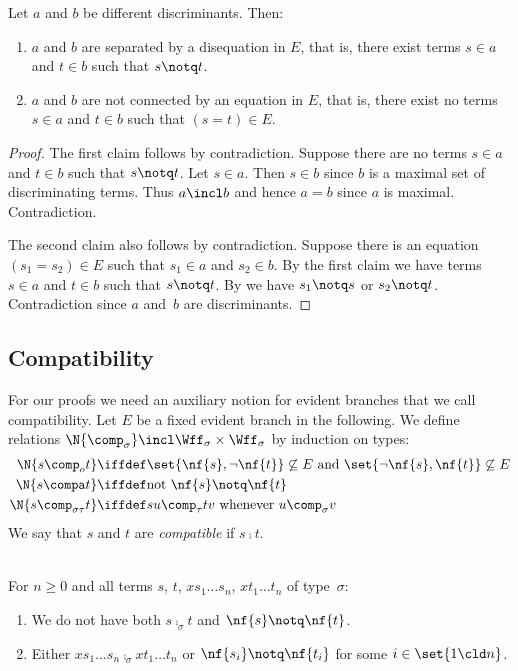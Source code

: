 \begin{prop}
  \label{prop-diff-discs}
  Let $a$ and $b$ be different discriminants.
  Then:
  \begin{enumerate}[\em(1)]
  \item $a$ and $b$ are separated by a disequation
    in $E$, that is, there exist terms $s\in a$ and
    $t\in b$ such that $s\notq t$.
  \item $a$ and $b$ are not connected by an
    equation in $E$, that is, there exist no terms
    $s\in a$ and $t\in b$ such that $(s{=}
    t)\in E$.
  \end{enumerate}
\end{prop}

\begin{proof}
  The first claim follows by contradiction.  Suppose
  there are no terms ${s\in a}$ and $t\in b$ such that
  $s\notq t$.  Let $s\in a$.  Then $s\in b$ since $b$
  is a maximal set of discriminating terms.  Thus
  $a\incl b$ and hence $a=b$ since $a$ is maximal.
  Contradiction.

  The second claim also follows by contradiction.
  Suppose there is an equation $(s_1{=} s_2)\in E$ such
  that $s_1\in a$ and $s_2\in b$.  By the first
  claim we have terms $s\in a$ and $t\in b$
  such that $s\notq t$.  By \ECon we have $s_1\notq
  s$ or $s_2\notq t$.  Contradiction since $a$
  and~$b$ are discriminants.
\end{proof}

\subsection{Compatibility}\label{sec:compat}

For our proofs we need an auxiliary notion for evident
branches that we call compatibility.  Let $E$ be a
fixed evident branch in the following.  We define
relations
$\N{\comp_\sigma}\incl\Wff_\sigma\times\Wff_\sigma$ by
induction on types:
\begin{align*}
  \N{s\comp_o t}&\iffdef 
  \set{\nf{s},\neg\nf{t}}\not\subseteq E~\mathrm{and}~
  \set{\neg\nf{s},\nf{t}}\not\subseteq E\\
  \N{s\compa t}&\iffdef
  \mathrm{not}~\nf{s}\notq\nf{t}\\
  \N{s\comp_{\sigma\tau}t}&\iffdef 
  s u\comp_\tau t v~\text{whenever}~u\comp_\sigma v
\end{align*}
We say that $s$ and $t$ are \emph{compatible} if
$s\comp t$.

\begin{lem}[Compatibility]
  \label{lem-compatibility}~\\
  For $n\ge0$ and all terms $s$, $t$, $xs_1\dots s_n$,
  $xt_1\dots t_n$ of type~$\sigma$:
  \begin{enumerate}[\em(1)]
  \item We do not have both $s\comp_\sigma t$ and $\nf{s}\notq\nf{t}$.
  \item Either $xs_1\dots s_n\comp_\sigma xt_1\dots t_n$
    or $\nf{s_i}\notq\nf{t_i}$ for some
    $i\in\set{1\cld n}$.
  \end{enumerate}
\end{lem}


